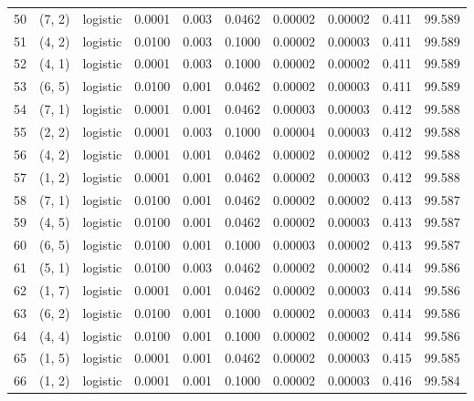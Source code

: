 \begin{tabular}{lllrrrrrrr}
50  &      (7, 2) &  logistic &  0.0001 &  0.003 &  0.0462 &          0.00002 &    0.00002 &       0.411 &    99.589 \\
51  &      (4, 2) &  logistic &  0.0100 &  0.003 &  0.1000 &          0.00002 &    0.00003 &       0.411 &    99.589 \\
52  &      (4, 1) &  logistic &  0.0001 &  0.003 &  0.1000 &          0.00002 &    0.00002 &       0.411 &    99.589 \\
53  &      (6, 5) &  logistic &  0.0100 &  0.001 &  0.0462 &          0.00002 &    0.00003 &       0.411 &    99.589 \\
54  &      (7, 1) &  logistic &  0.0001 &  0.001 &  0.0462 &          0.00003 &    0.00003 &       0.412 &    99.588 \\
55  &      (2, 2) &  logistic &  0.0001 &  0.003 &  0.1000 &          0.00004 &    0.00003 &       0.412 &    99.588 \\
56  &      (4, 2) &  logistic &  0.0001 &  0.001 &  0.0462 &          0.00002 &    0.00002 &       0.412 &    99.588 \\
57  &      (1, 2) &  logistic &  0.0001 &  0.001 &  0.0462 &          0.00002 &    0.00003 &       0.412 &    99.588 \\
58  &      (7, 1) &  logistic &  0.0100 &  0.001 &  0.0462 &          0.00002 &    0.00002 &       0.413 &    99.587 \\
59  &      (4, 5) &  logistic &  0.0100 &  0.001 &  0.0462 &          0.00002 &    0.00003 &       0.413 &    99.587 \\
60  &      (6, 5) &  logistic &  0.0100 &  0.001 &  0.1000 &          0.00003 &    0.00002 &       0.413 &    99.587 \\
61  &      (5, 1) &  logistic &  0.0100 &  0.003 &  0.0462 &          0.00002 &    0.00002 &       0.414 &    99.586 \\
62  &      (1, 7) &  logistic &  0.0001 &  0.001 &  0.0462 &          0.00002 &    0.00003 &       0.414 &    99.586 \\
63  &      (6, 2) &  logistic &  0.0100 &  0.001 &  0.1000 &          0.00002 &    0.00003 &       0.414 &    99.586 \\
64  &      (4, 4) &  logistic &  0.0100 &  0.001 &  0.1000 &          0.00002 &    0.00002 &       0.414 &    99.586 \\
65  &      (1, 5) &  logistic &  0.0001 &  0.001 &  0.0462 &          0.00002 &    0.00003 &       0.415 &    99.585 \\
66  &      (1, 2) &  logistic &  0.0001 &  0.001 &  0.1000 &          0.00002 &    0.00003 &       0.416 &    99.584 \\

\end{tabular}
